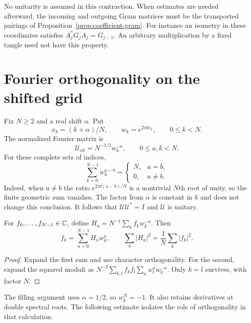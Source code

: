 No unitarity is assumed in this contraction. When estimates are
needed afterward, the incoming and outgoing Gram matrices must be
the transported pairings of Proposition~\ref{prop:coefficient-gram}.
For instance an isometry in these coordinates satisfies
$A_j^*G_jA_j=G_{j-1}$. An arbitrary multiplication by a fixed
tangle need not have this property.

\section{Fourier orthogonality on the shifted grid}

Fix $N\ge2$ and a real shift $\alpha$. Put
\[
 x_k=(k+\alpha)/N,\qquad
 w_k=e^{2\pi\ii x_k},\qquad 0\le k<N.
\]
The normalized Fourier matrix is
\[
 \mathcal U_{ak}=N^{-1/2}w_k^{-a},
                   \qquad0\le a,k<N.
\]
For these complete sets of indices,
\[
 \sum_{k=0}^{N-1}w_k^{a-b}
   =\begin{cases}N,&a=b,\\0,&a\ne b.\end{cases}
\]
Indeed, when $a\ne b$ the ratio
$e^{2\pi\ii(a-b)/N}$ is a nontrivial $N$th root of unity, so the
finite geometric sum vanishes. The factor from $\alpha$ is
constant in $k$ and does not change this conclusion. It follows
that $\mathcal U\mathcal U^*=I$ and $\mathcal U$ is unitary.

\begin{proposition}
\label{prop:shifted-parseval}
For $f_0,\ldots,f_{N-1}\in\mathbb C$, define
$H_a=N^{-1}\sum_k f_kw_k^{-a}$. Then
\[
 f_k=\sum_{a=0}^{N-1}H_aw_k^a,\qquad
 \sum_a|H_a|^2=\frac1N\sum_k|f_k|^2.
\]
\end{proposition}
\begin{proof}
Expand the first sum and use character orthogonality. For the
second, expand the squared moduli as
$N^{-2}\sum_{k,l}f_k\overline{f_l}\sum_aw_l^aw_k^{-a}$.
Only $k=l$ survives, with factor $N$.
\end{proof}

The filling argument uses $\alpha=1/2$, so $w_k^N=-1$. It also
retains derivatives at double spectral roots. The following estimate
isolates the role of orthogonality in that calculation.

